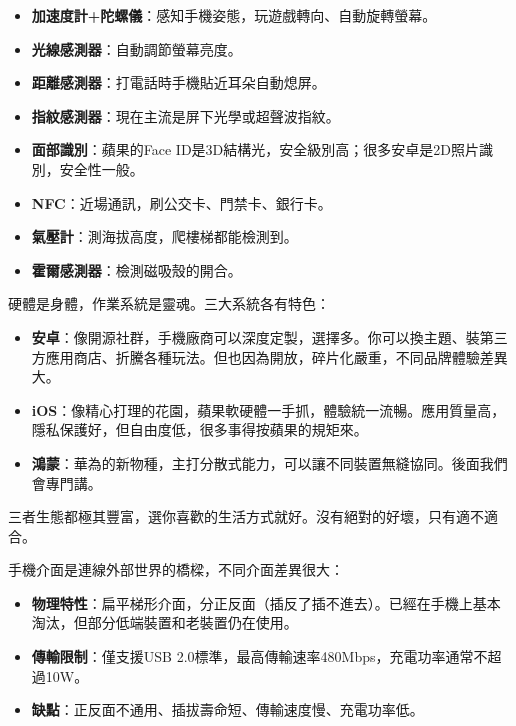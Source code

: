 \begin{itemize}
  \item \textbf{加速度計+陀螺儀}：感知手機姿態，玩遊戲轉向、自動旋轉螢幕。
  \item \textbf{光線感測器}：自動調節螢幕亮度。
  \item \textbf{距離感測器}：打電話時手機貼近耳朵自動熄屏。
  \item \textbf{指紋感測器}：現在主流是屏下光學或超聲波指紋。
  \item \textbf{面部識別}：蘋果的Face ID是3D結構光，安全級別高；很多安卓是2D照片識別，安全性一般。
  \item \textbf{NFC}：近場通訊，刷公交卡、門禁卡、銀行卡。
  \item \textbf{氣壓計}：測海拔高度，爬樓梯都能檢測到。
  \item \textbf{霍爾感測器}：檢測磁吸殼的開合。
\end{itemize}


硬體是身體，作業系統是靈魂。三大系統各有特色：

\begin{itemize}
  \item \textbf{安卓}：像開源社群，手機廠商可以深度定製，選擇多。你可以換主題、裝第三方應用商店、折騰各種玩法。但也因為開放，碎片化嚴重，不同品牌體驗差異大。
  \item \textbf{iOS}：像精心打理的花園，蘋果軟硬體一手抓，體驗統一流暢。應用質量高，隱私保護好，但自由度低，很多事得按蘋果的規矩來。
  \item \textbf{鴻蒙}：華為的新物種，主打分散式能力，可以讓不同裝置無縫協同。後面我們會專門講。
\end{itemize}

三者生態都極其豐富，選你喜歡的生活方式就好。沒有絕對的好壞，只有適不適合。


手機介面是連線外部世界的橋樑，不同介面差異很大：


\begin{itemize}
  \item \textbf{物理特性}：扁平梯形介面，分正反面（插反了插不進去）。已經在手機上基本淘汰，但部分低端裝置和老裝置仍在使用。
  \item \textbf{傳輸限制}：僅支援USB 2.0標準，最高傳輸速率480Mbps，充電功率通常不超過10W。
  \item \textbf{缺點}：正反面不通用、插拔壽命短、傳輸速度慢、充電功率低。
\end{itemize}

